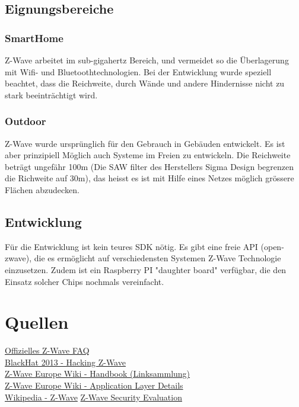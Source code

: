\documentclass[a4paper,11pt]{article}
\begin{document}
\subsection*{Eignungsbereiche}
\subsubsection*{SmartHome}
Z-Wave arbeitet im sub-gigahertz Bereich, und vermeidet so die Überlagerung mit Wifi- und Bluetoothtechnologien. Bei der Entwicklung wurde speziell beachtet, dass die Reichweite, durch Wände und andere Hindernisse nicht zu stark beeinträchtigt wird.

\subsubsection*{Outdoor}
Z-Wave wurde ursprünglich für den Gebrauch in Gebäuden entwickelt. Es ist aber prinzipiell Möglich auch Systeme im Freien zu entwickeln. Die Reichweite beträgt ungefähr 100m (Die SAW filter des Herstellers Sigma Design begrenzen die Richweite auf 30m), das heisst es ist mit Hilfe eines Netzes möglich grössere Flächen abzudecken.

\subsection*{Entwicklung}
Für die Entwicklung ist kein teures SDK nötig. Es gibt eine freie API (open-zwave), die es ermöglicht auf verschiedensten Systemen Z-Wave Technologie einzusetzen. Zudem ist ein Raspberry PI "daughter board" verfügbar, die den Einsatz solcher Chips nochmals vereinfacht.

\section*{Quellen}

\href{http://www.z-wave.com/faq}{Offizielles Z-Wave FAQ}\\
\href{https://www.youtube.com/watch?v=KYaEQhvodc8}{BlackHat 2013 - Hacking Z-Wave}\\
\href{http://wiki.zwaveeurope.com/index.php?title=Z-Wave_Technical_Handbook}{Z-Wave Europe Wiki - Handbook (Linksammlung)}\\
\href{http://wiki.zwaveeurope.com/index.php?title=Z-Wave_Application_Layer}{Z-Wave Europe Wiki - Application Layer Details}\\
\href{https://en.wikipedia.org/wiki/Z-Wave}{Wikipedia - Z-Wave}
\href{https://www.sensepost.com/cms/resources/conferences/2013/bh_zwave/Security\%20Evaluation\%20of\%20Z-Wave_WP.pdf}{Z-Wave Security Evaluation}
\end{document}
